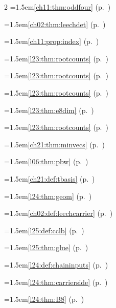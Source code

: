 \begin{multicols}{2}
\hangindent=1.5em\quad \ref{ch11:thm:oddfour} (p.~\pageref{ch11:thm:oddfour})\par
\hangindent=1.5em\quad \ref{ch02:thm:leechdet} (p.~\pageref{ch02:thm:leechdet})\par
\hangindent=1.5em\quad \ref{ch11:prop:index} (p.~\pageref{ch11:prop:index})\par
\hangindent=1.5em\quad \ref{l23:thm:rootcounts} (p.~\pageref{l23:thm:rootcounts})\par
\hangindent=1.5em\quad \ref{l23:thm:rootcounts} (p.~\pageref{l23:thm:rootcounts})\par
\hangindent=1.5em\quad \ref{l23:thm:rootcounts} (p.~\pageref{l23:thm:rootcounts})\par
\hangindent=1.5em\quad \ref{l23:thm:e8dim} (p.~\pageref{l23:thm:e8dim})\par
\hangindent=1.5em\quad \ref{l23:thm:rootcounts} (p.~\pageref{l23:thm:rootcounts})\par
\hangindent=1.5em\quad \ref{ch21:thm:minvecs} (p.~\pageref{ch21:thm:minvecs})\par
\hangindent=1.5em\quad \ref{l06:thm:pbw} (p.~\pageref{l06:thm:pbw})\par
\hangindent=1.5em\quad \ref{ch21:def:tbasis} (p.~\pageref{ch21:def:tbasis})\par
\hangindent=1.5em\quad \ref{l24:thm:geom} (p.~\pageref{l24:thm:geom})\par
\hangindent=1.5em\quad \ref{ch02:def:leechcarrier} (p.~\pageref{ch02:def:leechcarrier})\par
\hangindent=1.5em\quad \ref{l25:def:cclb} (p.~\pageref{l25:def:cclb})\par
\hangindent=1.5em\quad \ref{l25:thm:glue} (p.~\pageref{l25:thm:glue})\par
\hangindent=1.5em\quad \ref{l24:def:chaininputs} (p.~\pageref{l24:def:chaininputs})\par
\hangindent=1.5em\quad \ref{l24:thm:carrierside} (p.~\pageref{l24:thm:carrierside})\par
\hangindent=1.5em\quad \ref{l24:thm:B8} (p.~\pageref{l24:thm:B8})\par

\end{multicols}
